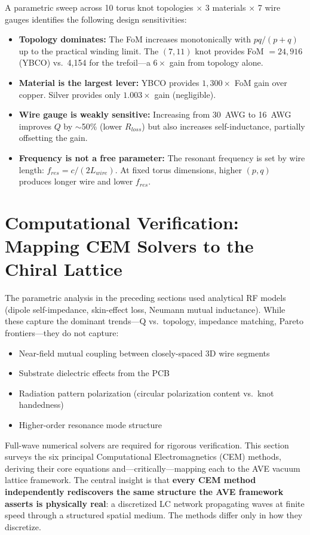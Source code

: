A parametric sweep across 10 torus knot topologies $\times$ 3 materials $\times$ 7 wire gauges identifies the following design sensitivities:
\begin{itemize}
    \item \textbf{Topology dominates:} The FoM increases monotonically with $pq/(p+q)$ up to the practical winding limit. The $(7,11)$ knot provides FoM $= 24{,}916$ (YBCO) vs.\ 4{,}154 for the trefoil---a $6\times$ gain from topology alone.
    \item \textbf{Material is the largest lever:} YBCO provides $1{,}300\times$ FoM gain over copper. Silver provides only $1.003\times$ gain (negligible).
    \item \textbf{Wire gauge is weakly sensitive:} Increasing from 30~AWG to 16~AWG improves $Q$ by $\sim$50\% (lower $R_{loss}$) but also increases self-inductance, partially offsetting the gain.
    \item \textbf{Frequency is not a free parameter:} The resonant frequency is set by wire length: $f_{res} = c/(2L_{wire})$. At fixed torus dimensions, higher $(p,q)$ produces longer wire and lower $f_{res}$.
\end{itemize}

\section{Computational Verification: Mapping CEM Solvers to the Chiral Lattice}
\label{sec:cem_methods}

The parametric analysis in the preceding sections used analytical RF models (dipole self-impedance, skin-effect loss, Neumann mutual inductance). While these capture the dominant trends---Q vs.\ topology, impedance matching, Pareto frontiers---they do not capture:
\begin{itemize}
    \item Near-field mutual coupling between closely-spaced 3D wire segments
    \item Substrate dielectric effects from the PCB
    \item Radiation pattern polarization (circular polarization content vs.\ knot handedness)
    \item Higher-order resonance mode structure
\end{itemize}

Full-wave numerical solvers are required for rigorous verification. This section surveys the six principal Computational Electromagnetics (CEM) methods, deriving their core equations and---critically---mapping each to the AVE vacuum lattice framework. The central insight is that \textbf{every CEM method independently rediscovers the same structure the AVE framework asserts is physically real}: a discretized LC network propagating waves at finite speed through a structured spatial medium. The methods differ only in how they discretize.

